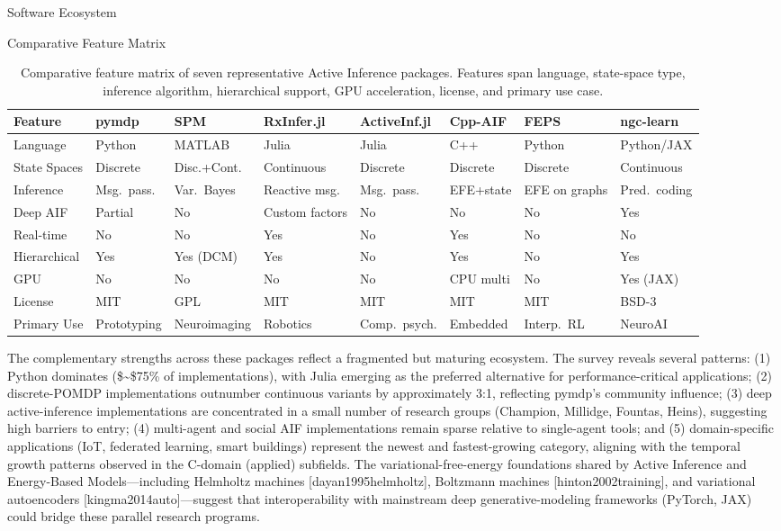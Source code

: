\documentclass[
  ignorenonframetext,
]{beamer}
\providecommand{\citep}[1]{[#1]}
\begin{document}
\begin{frame}{Software Ecosystem}
\begin{block}{Comparative Feature Matrix}
\protect{}\label{comparative-feature-matrix}
\begin{table}[H]
\centering
\caption{Comparative feature matrix of seven representative Active Inference packages. Features span language, state-space type, inference algorithm, hierarchical support, GPU acceleration, license, and primary use case.}
\label{tab:aif_feature_matrix}
\small
\begin{tabular}{llllllll}
\toprule
\textbf{Feature} & \textbf{pymdp} & \textbf{SPM} & \textbf{RxInfer.jl} & \textbf{ActiveInf.jl} & \textbf{Cpp-AIF} & \textbf{FEPS} & \textbf{ngc-learn} \\
\midrule
Language & Python & MATLAB & Julia & Julia & C++ & Python & Python/JAX \\
State Spaces & Discrete & Disc.+Cont. & Continuous & Discrete & Discrete & Discrete & Continuous \\
Inference & Msg.\ pass. & Var.\ Bayes & Reactive msg. & Msg.\ pass. & EFE+state & EFE on graphs & Pred.\ coding \\
Deep AIF & Partial & No & Custom factors & No & No & No & Yes \\
Real-time & No & No & Yes & No & Yes & No & No \\
Hierarchical & Yes & Yes (DCM) & Yes & No & Yes & No & Yes \\
GPU & No & No & No & No & CPU multi & No & Yes (JAX) \\
License & MIT & GPL & MIT & MIT & MIT & MIT & BSD-3 \\
Primary Use & Prototyping & Neuroimaging & Robotics & Comp.\ psych. & Embedded & Interp.\ RL & NeuroAI \\
\bottomrule
\end{tabular}
\end{table}

The complementary strengths across these packages reflect a fragmented
but maturing ecosystem. The survey reveals several patterns: (1) Python
dominates (\$\sim\$75\% of implementations), with Julia emerging as the
preferred alternative for performance-critical applications; (2)
discrete-POMDP implementations outnumber continuous variants by
approximately 3:1, reflecting pymdp's community influence; (3) deep
active-inference implementations are concentrated in a small number of
research groups (Champion, Millidge, Fountas, Heins), suggesting high
barriers to entry; (4) multi-agent and social AIF implementations remain
sparse relative to single-agent tools; and (5) domain-specific
applications (IoT, federated learning, smart buildings) represent the
newest and fastest-growing category, aligning with the temporal growth
patterns observed in the C-domain (applied) subfields. The
variational-free-energy foundations shared by Active Inference and
Energy-Based Models---including Helmholtz machines
\citep{dayan1995helmholtz}, Boltzmann machines
\citep{hinton2002training}, and variational autoencoders
\citep{kingma2014auto}---suggest that interoperability with mainstream
deep generative-modeling frameworks (PyTorch, JAX) could bridge these
parallel research programs.


\end{block}
\end{frame}
\end{document}
